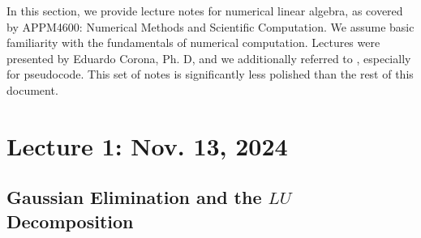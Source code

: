 In this section, we provide lecture notes for numerical linear algebra, as covered by APPM4600: Numerical Methods and Scientific Computation. We assume basic familiarity with the fundamentals of numerical computation. Lectures were presented by Eduardo Corona, Ph. D, and we additionally referred to \cite{olver2006applied}, especially for pseudocode. This set of notes is significantly less polished than the rest of this document.
\section{Lecture 1: Nov. 13, 2024}

    \subsection{Gaussian Elimination and the \(LU\) Decomposition}


